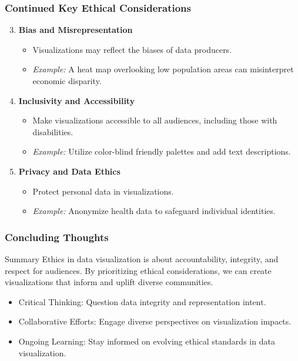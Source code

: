 \documentclass[aspectratio=169]{beamer}
\begin{document}
\begin{frame}[fragile]
    \frametitle{Continued Key Ethical Considerations}
    \begin{enumerate}
        \setcounter{enumi}{2}
        \item \textbf{Bias and Misrepresentation}
            \begin{itemize}
                \item Visualizations may reflect the biases of data producers.
                \item \textit{Example:} A heat map overlooking low population areas can misinterpret economic disparity.
            \end{itemize}

        \item \textbf{Inclusivity and Accessibility}
            \begin{itemize}
                \item Make visualizations accessible to all audiences, including those with disabilities.
                \item \textit{Example:} Utilize color-blind friendly palettes and add text descriptions.
            \end{itemize}
        
        \item \textbf{Privacy and Data Ethics}
            \begin{itemize}
                \item Protect personal data in visualizations.
                \item \textit{Example:} Anonymize health data to safeguard individual identities.
            \end{itemize}
    \end{enumerate}
\end{frame}

\begin{frame}[fragile]
    \frametitle{Concluding Thoughts}
    \begin{block}{Summary}
        Ethics in data visualization is about accountability, integrity, and respect for audiences. 
        By prioritizing ethical considerations, we can create visualizations that inform and uplift diverse communities.
    \end{block}
    \begin{itemize}
        \item Critical Thinking: Question data integrity and representation intent.
        \item Collaborative Efforts: Engage diverse perspectives on visualization impacts.
        \item Ongoing Learning: Stay informed on evolving ethical standards in data visualization.
    \end{itemize}
\end{frame}
\end{document}
